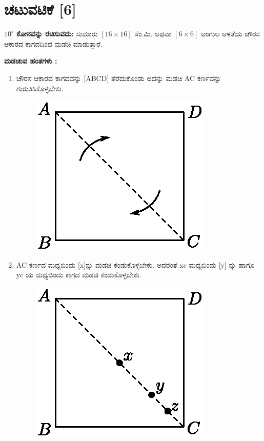 \section*{ಚಟುವಟಿಕೆ [6]} \textbf{$10^\circ$ ಕೋನವನ್ನು ರಚಿಸುವದು:} ಸುಮಾರು $[16 \times 16]$ ಸೆಂ.ಮಿ. ಅಥವಾ  $[6 \times 6]$ ಅಂಗುಲ ಅಳತೆಯ ಚೌರಸ ಆಕಾರದ ಕಾಗದದಿಂದ ಮಡಚಿ ಮಾಡುತ್ತಾರೆ. 

\noindent
\textbf{ಮಡಚುವ ಹಂತಗಳು :}
\begin{enumerate}
\item ಚೌರಸ ಆಕಾರದ ಕಾಗದವನ್ನು [ABCD] ತೆರೆದುಕೊಂಡು ಅದನ್ನು ಮಡಚಿ AC ಕರ್ಣವನ್ನು ಗುರುತಿಸಿಕೊಳ್ಳಬೇಕು. 
\begin{figure}[H]
\centering
\includegraphics[scale=.9]{src/figure/chap1/fig1-12a.eps}
\end{figure}

\item AC ಕರ್ಣದ ಮಧ್ಯಬಿಂದು [x]ನ್ನು ಮಡಚಿ ಕಂಡುಕೊಳ್ಳಬೇಕು. ಅದರಂತೆ  xc ಮಧ್ಯಬಿಂದು [y] ನ್ನು ಹಾಗೂ  yc ಯ ಮಧ್ಯಬಿಂದು ಕಾಗದ ಮಡಚಿ ಕಂಡು\break ಕೊಳ್ಳಬೇಕು. 
\begin{figure}[H]
\centering
\includegraphics[scale=.9]{src/figure/chap1/fig1-12b.eps}
\end{figure}


\end{enumerate}
